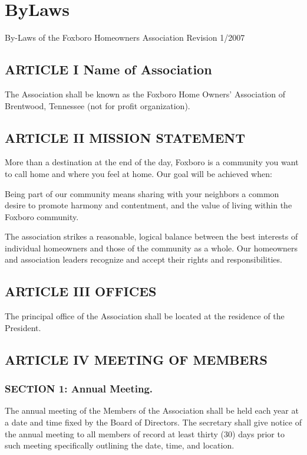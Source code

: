 \section{ByLaws}
By-Laws of the Foxboro Homeowners Association
Revision 1/2007


\subsection{ARTICLE I Name of Association}

The Association shall be known as the Foxboro Home Owners’ Association of Brentwood, Tennessee (not for profit organization).

\subsection{ARTICLE II MISSION STATEMENT}

More than a destination at the end of the day, Foxboro is a community
you want to call home and where you feel at home. Our goal will be
achieved when:

Being part of our community means sharing with your neighbors a common
desire to promote harmony and contentment, and the value of living within
the Foxboro community.

The association strikes a reasonable, logical balance between the best
interests of individual homeowners and those of the community as a whole.
Our homeowners and association leaders recognize and accept their rights
and responsibilities.

\subsection{ARTICLE III OFFICES}

The principal office of the Association shall be located at the residence
of the President.

\subsection{ARTICLE IV MEETING OF MEMBERS}

\subsubsection{SECTION 1: Annual Meeting.}

The annual meeting of the Members of the Association shall be held each
year at a date and time fixed by the Board of Directors. The secretary
shall give notice of the annual meeting to all members of record at least
thirty (30) days prior to such meeting specifically outlining the date,
time, and location.

